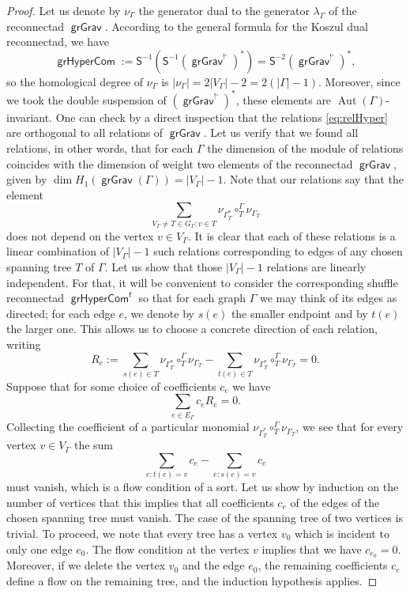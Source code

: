 \documentclass[11pt]{article}
\theoremstyle{definition}
\numberwithin{equation}{section}
\DeclareMathOperator{\Aut}{Aut}
\DeclareMathOperator{\grGrav}{\mathsf{grGrav}}
\DeclareMathOperator{\grHyperCom}{\mathsf{grHyperCom}}
\begin{document}
\begin{proof}
Let us denote by $\nu_{\Gamma}$ the generator dual to the generator $\lambda_{\Gamma}$ of the reconnectad $\grGrav$. According to the general formula for the Koszul dual reconnectad, we have 
 \[
\grHyperCom := \mathsf{S}^{-1}(\mathsf{S}^{-1}(\grGrav^{\text{!`}})^*)=\mathsf{S}^{-2}(\grGrav^{\text{!`}})^*,
 \]
so the homological degree of $\nu_{\Gamma}$ is $|\nu_{\Gamma}|=2|V_\Gamma|-2=2(|\Gamma|-1)$. Moreover, since we took the double suspension of $(\grGrav^{\text{!`}})^*$, these elements are $\Aut(\Gamma)$-invariant. One can check by a direct inspection that the relations \eqref{eq:relHyper} are orthogonal to all relations of $\grGrav$. Let us verify that we found all relations, in other words, that for each $\Gamma$ the dimension of the module of relations coincides with the dimension of weight two elements of the reconnectad $\grGrav$, given by 
$\dim H_1(\grGrav(\Gamma))=|V_\Gamma|-1$. Note that our relations say that the element 
 \[
\sum_{V_\Gamma\ne T\in G_\Gamma\colon v \in T} \nu_{\Gamma^*_T}\circ_T^{\Gamma} \nu_{\Gamma_T}  \]
does not depend on the vertex $v\in V_\Gamma$. It is clear that each of these relations is a linear combination of $|V_\Gamma|-1$ such relations corresponding to edges of any chosen spanning tree $T$ of $\Gamma$. Let us show that those $|V_\Gamma|-1$ relations are linearly independent. For that, it will be convenient to consider the corresponding shuffle reconnectad $\grHyperCom^{\mathsf{f}}$ so that for each graph $\Gamma$ we may think of its edges as directed; for each edge $e$, we denote by $s(e)$ the smaller endpoint and by $t(e)$ the larger one. This allows us to choose a concrete direction of each relation, writing 
 \[
R_e:=\sum_{s(e) \in T} \nu_{\Gamma^*_T}\circ_T^{\Gamma} \nu_{\Gamma_T} -
\sum_{t(e) \in T} \nu_{\Gamma^*_T}\circ_T^{\Gamma} \nu_{\Gamma_T}=0.
 \]
Suppose that for some choice of coefficients $c_e$ we have
 \[
\sum_{e \in E_\Gamma} c_eR_e=0.
 \] 
Collecting the coefficient of a particular monomial $\nu_{\Gamma^*_T}\circ_T^{\Gamma} \nu_{\Gamma_T}$, we see that for every vertex $v \in V_\Gamma$ the sum 
 \[
\sum_{e\colon t(e)=v} c_e - \sum_{e\colon s(e)=v} c_e
 \]
must vanish, which is a flow condition of a sort. Let us show by induction on the number of vertices that this implies that all coefficients $c_e$ of the edges of the chosen spanning tree must vanish. The case of the spanning tree of two vertices is trivial. To proceed, we note that every tree has a vertex $v_0$ which is incident to only one edge $e_0$. The flow condition at the vertex $v$ implies that we have $c_{e_0}=0$. Moreover, if we delete the vertex $v_0$ and the edge $e_0$, the remaining coefficients $c_e$ define a flow on the remaining tree, and the induction hypothesis applies. 
\end{proof}
\end{document}
